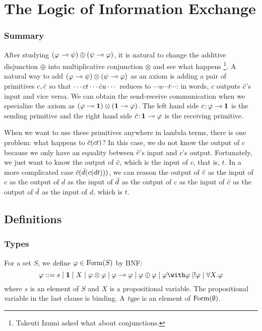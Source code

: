 \chapter{The Logic of Information Exchange}
\label{ch:exchange}

\subsection{Summary}

After studying $(\varphi\multimap\psi)\oplus (\psi\multimap\varphi)$,
it is natural to change the additive disjunction $\oplus$ into
multiplicative conjunction $\otimes$ and see what happens%
\footnote{Takeuti Izumi asked what about conjunctions.}.
A natural way to add $(\varphi\multimap\psi)\otimes(\psi\multimap\varphi)$ as an axiom
is adding a pair of primitives $c,\bar{c}$ so that
$\cdots ct \cdots \bar{c} u \cdots$ reduces to
$\cdots u  \cdots t \cdots$: in words,
$c$ outputs $\bar{c}$'s input and vice versa.
We can obtain the send-receive communication when we specialize the
axiom as $(\varphi\multimap \mathbf{1})\otimes(\mathbf{1}\multimap\varphi)$.  The left hand side
${c} \mathord{\colon\kern -2pt}{\varphi\multimap\mathbf{1}}$ is the sending primitive and
the right hand side ${\bar{c}} \mathord{\colon\kern -2pt}{\mathbf{1} \multimap\varphi}$ is the receiving
primitive.

When we want to use these primitives anywhere in lambda terms,
there is one problem: what happens to $\bar{c}(c t)$?
In this case, we do not know the output of $c$ because we only have an
equality between $\bar{c}$'s input and $c$'s output.
Fortunately, we just want to know the output of $\bar{c}$, which is the
input of $c$, that is, $t$.
In a more complicated case $\bar{c}(\bar{d}(c (d t)))$,
we can reason the output of $\bar{c}$ as the input of $c$ as the output of
$d$ as the input of $\bar{d}$ as the output of $c$ as the input of $\bar{c}$
as the output of $\bar{d}$ as the input of $d$, which is $t$.

\section{Definitions}

\subsection{Types}
For a set $S$, we define $\varphi\in\mathop{\text{Form}}(S)$ by BNF:
\[
 \phi::=s\mid \one \mid X \mid \phi\otimes\phi\mid \phi\limp\phi\mid
 \phi\oplus\phi\mid \phi\with\phi\mid !\phi\mid \forall X.\phi
\]
where $s$ is an element of $S$ and $X$ is a propositional variable.
The propositional variable in the last clause is binding.
A \textit{type} is an element of $\mathop{\text{Form}}(\emptyset)$.

